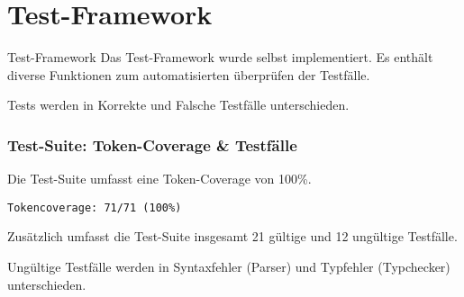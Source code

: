 \section{Test-Framework}

\begin{frame}{Test-Framework}
Das Test-Framework wurde selbst implementiert. Es enthält diverse Funktionen zum automatisierten überprüfen der Testfälle.

\par \medskip

Tests werden in Korrekte und Falsche Testfälle unterschieden.


\end{frame}

\begin{frame}[fragile]
	\frametitle{Test-Suite: Token-Coverage \& Testfälle}
	
Die Test-Suite umfasst eine Token-Coverage von 100\%. 

\begin{lstlisting}
Tokencoverage: 71/71 (100%)
\end{lstlisting}

Zusätzlich umfasst die Test-Suite insgesamt 21 gültige und 12 ungültige Testfälle.

\par \medskip

Ungültige Testfälle werden in Syntaxfehler (Parser) und Typfehler (Typchecker) unterschieden.
\end{frame}
